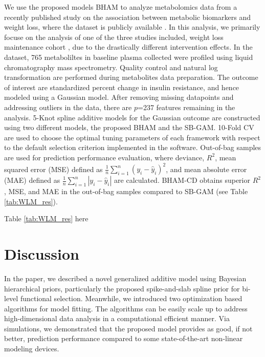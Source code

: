 \documentclass[AMA,STIX1COL,]{WileyNJD-v2}
\begin{document}
We use the proposed models BHAM to analyze metabolomics data from a
recently published study \citep{Bihlmeyer2021} on the association
between metabolic biomarkers and weight loss, where the dataset is
publicly available \citep{Bihlmeyer2021_data}. In this analysis, we
primarily focuse on the analysis of one of the three studies included,
weight loss maintenance cohort \citep{Svetkey2008}, due to the
drastically different intervention effects. In the dataset, 765
metaboliltes in baseline plasma collected were profiled using liquid
chromatography mass spectrometry. Quality control and natural log
transformation are performed during metabolites data preparation. The
outcome of interest are standardized percent change in insulin
resistance, and hence modeled using a Gaussian model. After removing
missing datapoints and addressing outliers in the data, there are
\(p\)=237 features remaining in the analysis. 5-Knot spline additive
models for the Gaussian outcome are constructed using two different
models, the proposed BHAM and the SB-GAM. 10-Fold CV are used to choose
the optimal tuning parameters of each framework with respect to the
default selection criterion implemented in the software. Out-of-bag
samples are used for prediction performance evaluation, where deviance,
\(R^2\), mean squared error (MSE) defined as
\(\frac{1}{n}\sum\limits^{n}_{i=1}(y_i - \hat y_i)^2\), and mean
absolute error (MAE) defined as
\(\frac{1}{n}\sum\limits^{n}_{i=1}|y_i - \hat y_i|\) are calculated.
BHAM-CD obtains superior \(R^2\), MSE, and MAE in the out-of-bag samples
compared to SB-GAM (see Table \ref{tab:WLM_res}).

\begin{center}
Table \ref{tab:WLM_res} here
\end{center}

\section{Discussion}
\label{sec:concl}

In the paper, we described a novel generalized additive model using
Bayesian hierarchical priors, particularly the proposed spike-and-slab
spline prior for bi-level functional selection. Meanwhile, we introduced
two optimization based algorithms for model fitting. The algorithms can
be easily scale up to address high-dimensional data analysis in a
computational efficient manner. Via simulations, we demonstrated that
the proposed model provides as good, if not better, prediction
performance compared to some state-of-the-art non-linear modeling
devices.
\end{document}
